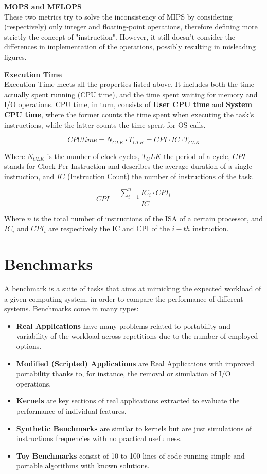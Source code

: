 \begin{example}
\textbf{MOPS and MFLOPS} \\
These two metrics try to solve the inconsistency of MIPS by considering (respectively) only integer and floating-point operations, therefore defining more strictly the concept of "instruction". However, it still doesn't consider the differences in implementation of the operations, possibly resulting in misleading figures.
\end{example}

\begin{example}
\textbf{Execution Time} \\
Execution Time meets all the properties listed above. It includes both the time actually spent running (CPU time), and the time spent waiting for memory and I/O operations. CPU time, in turn, consists of \textbf{User CPU time} and \textbf{System CPU time}, where the former counts the time spent when executing the task's instructions, while the latter counts the time spent for OS calls.
\end{example}

$$CPU time = N_{CLK} \cdot T_{CLK} = CPI \cdot IC \cdot T_{CLK}$$

Where $N_{CLK}$ is the number of clock cycles, $T_CLK$ the period of a cycle, $CPI$ stands for Clock Per Instruction and describes the average duration of a single instruction, and $IC$ (Instruction Count) the number of instructions of the task.

$$ CPI = \frac{\sum_{i=1}^{n}IC_i \cdot CPI_i}{IC}$$

Where $n$ is the total number of instructions of the ISA of a certain processor, and $IC_i$ and $CPI_i$ are respectively the IC and CPI of the $i-th$ instruction.

\section{Benchmarks}
A benchmark is a suite of tasks that aims at mimicking the expected workload of a given computing system, in order to compare the performance of different systems. Benchmarks come in many types:
\begin{itemize}
    \item \textbf{Real Applications} have many problems related to portability and variability of the workload across repetitions due to the number of employed options.
    \item \textbf{Modified (Scripted) Applications} are Real Applications with improved portability thanks to, for instance, the removal or simulation of I/O operations.
    \item \textbf{Kernels} are key sections of real applications extracted to evaluate the performance of individual features.
    \item \textbf{Synthetic Benchmarks} are similar to kernels but are just simulations of instructions frequencies with no practical usefulness.
    \item \textbf{Toy Benchmarks} consist of 10 to 100 lines of code running simple and portable algorithms with known solutions.
\end{itemize}

